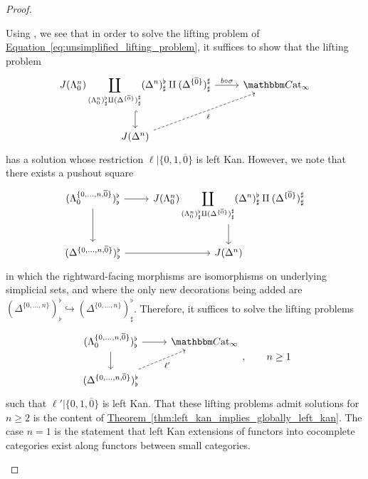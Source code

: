 \documentclass[main.tex]{subfiles}
\begin{document}
\begin{proof}
\begin{enumerate}
      Using \cite[Prop.~A.2.3.1]{highertopostheory}, we see that in order to solve the lifting problem of \hyperref[eq:unsimplified_lifting_problem]{Equation~\ref*{eq:unsimplified_lifting_problem}}, it suffices to show that the lifting problem
      \begin{equation*}
        \begin{tikzcd}
          J(\Lambda^{n}_{0}) \displaystyle\coprod_{(\Lambda^{n}_{0})^{\flat}_{\sharp} \amalg (\Delta^{\{\overline{0}\}})^{\sharp}_{\sharp}}(\Delta^{n})^{\flat}_{\sharp} \amalg (\Delta^{\{\overline{0}\}})^{\sharp}_{\sharp}
          \arrow[r, "b \circ \sigma"]
          \arrow[d, hook]
          & \ICCat
          \\
          J(\Delta^{n})
          \arrow[ur, dashed, swap, "\ell"]
        \end{tikzcd}
      \end{equation*}
      has a solution whose restriction $\ell|\{0,1,\overline{0}\}$ is left Kan. However, we note that there exists a pushout square
      \begin{equation*}
        \begin{tikzcd}
          (\Lambda^{\{0, \ldots, n, \overline{0}\}}_{0})^{\flat}_{\flat}
          \arrow[r]
          \arrow[d]
          & J(\Lambda^{n}_{0}) \displaystyle\coprod_{(\Lambda^{n}_{0})^{\flat}_{\sharp} \amalg (\Delta^{\{\overline{0}\}})^{\sharp}_{\sharp}}(\Delta^{n})^{\flat}_{\sharp} \amalg (\Delta^{\{\overline{0}\}})^{\sharp}_{\sharp}
          \arrow[d]
          \\
          (\Delta^{\{0, \ldots, n, \overline{0}\}})^{\flat}_{\flat}
          \arrow[r]
          & J(\Delta^{n})
        \end{tikzcd}
      \end{equation*}
      in which the rightward-facing morphisms are isomorphisms on underlying simplicial sets, and where the only new decorations being added are $(\Delta^{\{0, \ldots, n\}})^{\flat}_{\flat} \hookrightarrow (\Delta^{\{0, \ldots, n\}})^{\flat}_{\sharp}$. Therefore, it suffices to solve the lifting problems
      \begin{equation*}
        \begin{tikzcd}
          (\Lambda^{\{0, \ldots, n, \overline{0}\}}_{0})^{\flat}_{\flat}
          \arrow[r]
          \arrow[d]
          & \ICCat
          \\
          (\Delta^{\{0, \ldots, n, \overline{0}\}})^{\flat}_{\flat}
          \arrow[ur, dashed, swap, "\ell'"]
        \end{tikzcd},\qquad n \geq 1
      \end{equation*}
      such that $\ell'|\{0,1,\overline{0}\}$ is left Kan. That these lifting problems admit solutions for $n \geq 2$ is the content of \hyperref[thm:left_kan_implies_globally_left_kan]{Theorem~\ref*{thm:left_kan_implies_globally_left_kan}}. The case $n=1$ is the statement that left Kan extensions of functors into cocomplete categories exist along functors between small categories.


\end{enumerate}
\end{proof}
\end{document}
